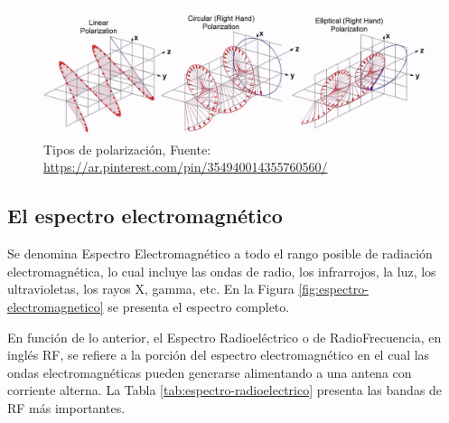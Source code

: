 \begin{description}
\begin{figure}[!htb]
  \centering
    \includegraphics[width=\textwidth]{06.radionavegacion/Imagenes/06.00.ondas.electromagneticas/polarizacion_ondas_EM.jpg}    
  \caption{Tipos de polarizaci\'on, {\footnotesize Fuente: \url{https://ar.pinterest.com/pin/354940014355760560/}}}
  \label{fig:06.tipos.polarizacion}
\end{figure}






\end{description}


\subsection{El espectro electromagn\'etico}

Se denomina Espectro Electromagn\'etico a todo el rango posible de radiaci\'on electromagn\'etica, lo cual incluye las ondas de radio, los infrarrojos, la luz, los ultravioletas, los rayos X, gamma, etc.
  En la Figura \ref{fig:espectro-electromagnetico} se presenta el espectro completo.

En funci\'on de lo anterior, el Espectro Radioel\'ectrico o de RadioFrecuencia, 
 en ingl\'es \ac{RF},
 se refiere a la porci\'on del espectro electromagn\'etico en el cual las ondas electromagn\'eticas pueden generarse alimentando a una antena con corriente alterna. La Tabla \ref{tab:espectro-radioelectrico}   presenta las bandas de RF m\'as importantes. 

